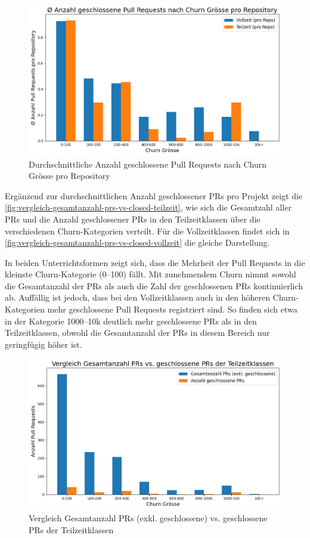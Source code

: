 \begin{figure}[htbp]
    \includegraphics[width=\textwidth]{Figures/avg-anz-clsd-prs-nach-churn.png}
    \caption{Durchschnittliche  Anzahl geschlossene Pull Requests nach Churn Grösse pro Repository}
    \label{fig:avg-anz-clsd-prs-nach-churn}
\end{figure}

Ergänzend zur durchschnittlichen Anzahl geschlossener PRs pro Projekt zeigt die \autoref{fig:vergleich-gesamtanzahl-prs-vs-closed-teilzeit}, wie sich die Gesamtzahl aller PRs und die Anzahl geschlossener PRs in den Teilzeitklassen über die verschiedenen Churn-Kategorien verteilt. Für die Vollzeitklassen findet sich in \autoref{fig:vergleich-gesamtanzahl-prs-vs-closed-vollzeit} die gleiche Darstellung.

In beiden Unterrichtsformen zeigt sich, dass die Mehrheit der Pull Requests in die kleinste Churn-Kategorie (0–100) fällt. Mit zunehmendem Churn nimmt sowohl die Gesamtanzahl der PRs als auch die Zahl der geschlossenen PRs kontinuierlich ab. Auffällig ist jedoch, dass bei den Vollzeitklassen auch in den höheren Churn-Kategorien mehr geschlossene Pull Requests registriert sind. So finden sich etwa in der Kategorie 1000–10k deutlich mehr geschlossene PRs als in den Teilzeitklassen, obwohl die Gesamtanzahl der PRs in diesem Bereich nur geringfügig höher ist.

\begin{figure}[htbp]
    \includegraphics[width=\textwidth]{Figures/vergleich-gesamtanzahl-prs-vs-closed-teilzeit.png}
    \caption{Vergleich Gesamtanzahl PRs (exkl. geschlossene) vs. geschlossene PRs der Teilzeitklassen}
    \label{fig:vergleich-gesamtanzahl-prs-vs-closed-teilzeit}
\end{figure}

